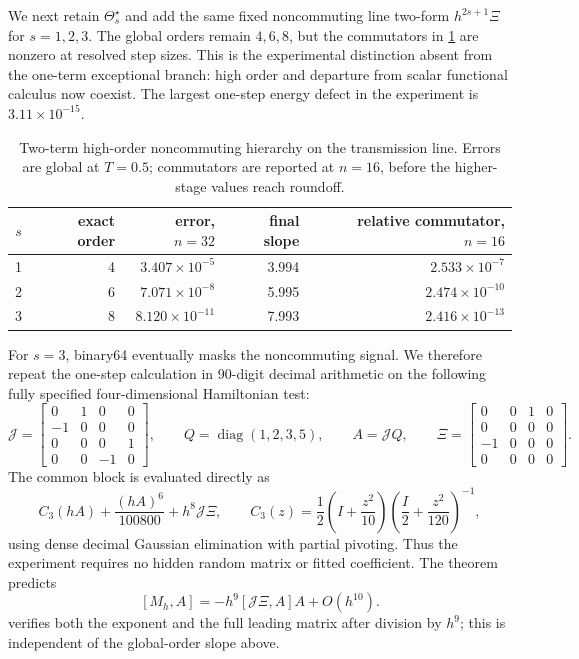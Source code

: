 \documentclass[11pt,a4paper]{article}
\newcommand{\diag}{\operatorname{diag}}
\begin{document}
We next retain \(\Theta_s^\star\) and add the same fixed noncommuting line
two-form \(h^{2s+1}\Xi\) for \(s=1,2,3\).  The global orders remain
\(4,6,8\), but the commutators in
\cref{tab:two-term-noncommuting} are nonzero at resolved step sizes.  This
is the experimental distinction absent from the one-term exceptional
branch: high order and departure from scalar functional calculus now
coexist.  The largest one-step energy defect in the experiment is
\(3.11\times10^{-15}\).

\begin{table}[H]
\centering
\caption{Two-term high-order noncommuting hierarchy on the transmission
line.  Errors are global at \(T=0.5\); commutators are reported at
\(n=16\), before the higher-stage values reach roundoff.}
\label{tab:two-term-noncommuting}
\begin{tabular}{@{}crrrr@{}}
\toprule
\(s\) & exact order & error, \(n=32\) & final slope
& relative commutator, \(n=16\) \\ \midrule
1 & 4 & \(3.407\times10^{-5}\) & 3.994 & \(2.533\times10^{-7}\)\\
2 & 6 & \(7.071\times10^{-8}\) & 5.995 & \(2.474\times10^{-10}\)\\
3 & 8 & \(8.120\times10^{-11}\) & 7.993 & \(2.416\times10^{-13}\)\\
\bottomrule
\end{tabular}
\end{table}

For \(s=3\), binary64 eventually masks the noncommuting signal.  We
therefore repeat the one-step calculation in 90-digit decimal arithmetic
on the following fully specified four-dimensional Hamiltonian test:
\begin{equation}\label{eq:decimal-test-matrices}
 \mathcal J=
 \begin{bmatrix}
 0&1&0&0\\-1&0&0&0\\0&0&0&1\\0&0&-1&0
 \end{bmatrix},\qquad
 Q=\diag(1,2,3,5),\qquad
 A=\mathcal JQ,
 \qquad
 \Xi=
 \begin{bmatrix}
 0&0&1&0\\0&0&0&0\\-1&0&0&0\\0&0&0&0
 \end{bmatrix}.
\end{equation}
The common block is evaluated directly as
\[
 C_3(hA)+\frac{(hA)^6}{100800}+h^8\mathcal J\Xi,
 \qquad
 C_3(z)=\frac12\left(I+\frac{z^2}{10}\right)
                 \left(\frac I2+\frac{z^2}{120}\right)^{-1},
\]
using dense decimal Gaussian elimination with partial pivoting.  Thus the
experiment requires no hidden random matrix or fitted coefficient.
The theorem predicts
\[
 [M_h,A]=-h^9[\mathcal J\Xi,A]A+O(h^{10}).
\]
 verifies both the exponent and the full
leading matrix after division by \(h^9\); this is independent of the
global-order slope above.
\end{document}
